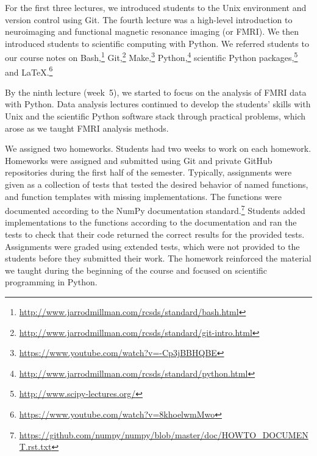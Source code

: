 For the first three lectures, we introduced students to the Unix environment
and version control using Git.
The fourth lecture was a high-level introduction to neuroimaging and
functional magnetic resonance imaging (or FMRI).
We then introduced students to scientific computing with Python.
We referred students to our course notes on
Bash,\footnote{\url{http://www.jarrodmillman.com/rcsds/standard/bash.html}}
Git,\footnote{\url{http://www.jarrodmillman.com/rcsds/standard/git-intro.html}}
Make,\footnote{\url{https://www.youtube.com/watch?v=-Cp3jBBHQBE}}
Python,\footnote{\url{http://www.jarrodmillman.com/rcsds/standard/python.html}}
scientific Python packages,\footnote{\url{http://www.scipy-lectures.org/}}
and \LaTeX.\footnote{\url{https://www.youtube.com/watch?v=8khoelwmMwo}}

By the ninth lecture (week~5), we started to focus on the analysis of FMRI data
with Python.
Data analysis lectures continued to develop the students' skills with
Unix and the scientific Python software stack through practical problems,
which arose as we taught FMRI analysis methods.

We assigned two homeworks.
Students had two weeks to work on each homework.
Homeworks were assigned and submitted using Git and private GitHub repositories during
the first half of the semester.
Typically, assignments were given as a collection of tests that tested the
desired behavior of named functions, and function templates with missing
implementations.
The functions were documented according to the NumPy documentation
standard.\footnote{\url{https://github.com/numpy/numpy/blob/master/doc/HOWTO_DOCUMENT.rst.txt}}
Students added implementations to the functions according to the documentation
and ran the tests to check that their code returned the correct results
for the provided tests.
Assignments were graded using extended tests, which were not provided to
the students before they submitted their work.
The homework reinforced the material we taught during the
beginning of the course and focused on scientific programming
in Python.

